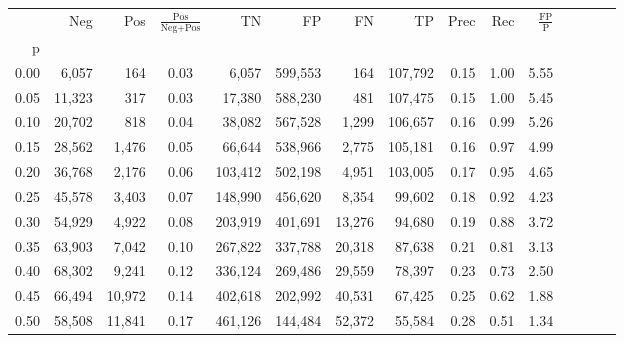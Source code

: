 \begin{tabular}{rrrcrrrrrrrrrrr}
\toprule
{} &     Neg &     Pos & $\frac{\text{Pos}}{\text{Neg}+\text{Pos}}$ &       TN &       FP &       FN &       TP &  Prec &   Rec & $\frac{\text{FP}}{\text{P}}$ \\
p    &         &         &                                            &          &          &          &          &       &       &                              \\
\midrule
0.00 &   6,057 &     164 &                                       0.03 &    6,057 &  599,553 &      164 &  107,792 &  0.15 &  1.00 &                         5.55 \\
0.05 &  11,323 &     317 &                                       0.03 &   17,380 &  588,230 &      481 &  107,475 &  0.15 &  1.00 &                         5.45 \\
0.10 &  20,702 &     818 &                                       0.04 &   38,082 &  567,528 &    1,299 &  106,657 &  0.16 &  0.99 &                         5.26 \\
0.15 &  28,562 &   1,476 &                                       0.05 &   66,644 &  538,966 &    2,775 &  105,181 &  0.16 &  0.97 &                         4.99 \\
0.20 &  36,768 &   2,176 &                                       0.06 &  103,412 &  502,198 &    4,951 &  103,005 &  0.17 &  0.95 &                         4.65 \\
0.25 &  45,578 &   3,403 &                                       0.07 &  148,990 &  456,620 &    8,354 &   99,602 &  0.18 &  0.92 &                         4.23 \\
0.30 &  54,929 &   4,922 &                                       0.08 &  203,919 &  401,691 &   13,276 &   94,680 &  0.19 &  0.88 &                         3.72 \\
0.35 &  63,903 &   7,042 &                                       0.10 &  267,822 &  337,788 &   20,318 &   87,638 &  0.21 &  0.81 &                         3.13 \\
0.40 &  68,302 &   9,241 &                                       0.12 &  336,124 &  269,486 &   29,559 &   78,397 &  0.23 &  0.73 &                         2.50 \\
0.45 &  66,494 &  10,972 &                                       0.14 &  402,618 &  202,992 &   40,531 &   67,425 &  0.25 &  0.62 &                         1.88 \\
0.50 &  58,508 &  11,841 &                                       0.17 &  461,126 &  144,484 &   52,372 &   55,584 &  0.28 &  0.51 &                         1.34 \\

\end{tabular}
